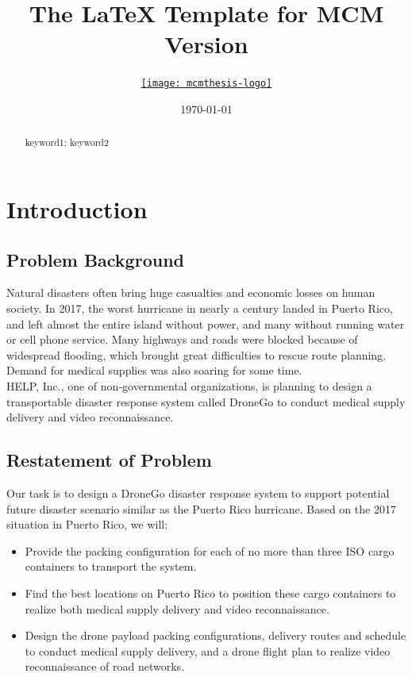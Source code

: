 \documentclass{mcmthesis}
\title{The \LaTeX{} Template for MCM Version \MCMversion}
\author{\small \href{http://www.latexstudio.net/}
  {\texttt{[image: mcmthesis-logo]}}}
\date{\today}
\begin{document}
\begin{abstract}
\lipsum[1]
\begin{keywords}
keyword1; keyword2
\end{keywords}
\end{abstract}
\maketitle
\tableofcontents
\newpage

\section{Introduction}
\subsection{Problem Background}
Natural disasters often bring huge casualties and economic losses on human society. In 2017, the worst hurricane in nearly a century landed in Puerto Rico, and left almost the entire island without power, and many without running water or cell phone service. Many highways and roads were blocked because of widespread flooding, which brought great difficulties to rescue route planning. Demand for medical supplies was also soaring for some time. \\

\noindent HELP, Inc., one of non-governmental organizations, is planning to design a transportable disaster response system called DroneGo to conduct medical supply delivery and video reconnaissance.

\subsection{Restatement of Problem}

Our task is to design a DroneGo disaster response system to support potential future disaster scenario similar as the Puerto Rico hurricane. Based on the 2017 situation in Puerto Rico, we will: 

\begin{itemize}
	\item Provide the packing configuration for each of no more than three ISO cargo containers to transport the system.
	\item Find the best locations on Puerto Rico to position these cargo containers to realize both medical supply delivery and video reconnaissance.
	\item Design the drone payload packing configurations, delivery routes and schedule to conduct medical supply delivery, and a drone flight plan to realize video reconnaissance of road networks.
\end{itemize}
\end{document}
